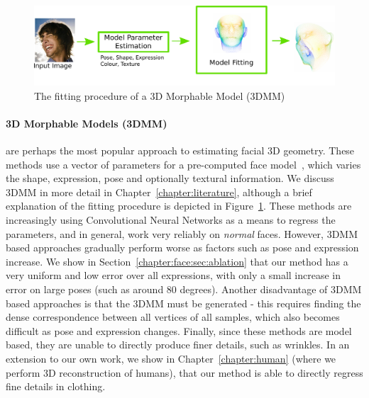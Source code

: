 \begin{figure}
  \includegraphics[width=\linewidth]{img/3dmm.pdf}
  \caption[3D Morphable Model Fitting Procedure]{The fitting procedure
    of a 3D Morphable Model (3DMM)}
  \label{fig:3dmm_fitting}
\end{figure}

\paragraph{3D Morphable Models (3DMM)} are perhaps the most popular
approach to estimating facial 3D geometry. These methods use a vector
of parameters for a pre-computed face
model~\cite{jourabloo2016large,huber2016multiresolution,zhu2016face,liu2016joint},
which varies the shape, expression, pose and optionally textural
information. We discuss 3DMM in more detail in
Chapter~\ref{chapter:literature}, although a brief explanation of the
fitting procedure is depicted in Figure~\ref{fig:3dmm_fitting}. These
methods are increasingly using Convolutional Neural Networks as a
means to regress the parameters, and in general, work very reliably on
\textit{normal} faces. However, 3DMM based approaches gradually
perform worse as factors such as pose and expression increase. We show
in Section~\ref{chapter:face:sec:ablation} that our method has a very
uniform and low error over all expressions, with only a small increase
in error on large poses (such as around 80 degrees). Another
disadvantage of 3DMM based approaches is that the 3DMM must be
generated - this requires finding the dense correspondence between all
vertices of all samples, which also becomes difficult as pose and
expression changes. Finally, since these methods are model based, they
are unable to directly produce finer details, such as wrinkles. In an
extension to our own work, we show in Chapter~\ref{chapter:human}
(where we perform 3D reconstruction of humans), that our method is
able to directly regress fine details in clothing.

